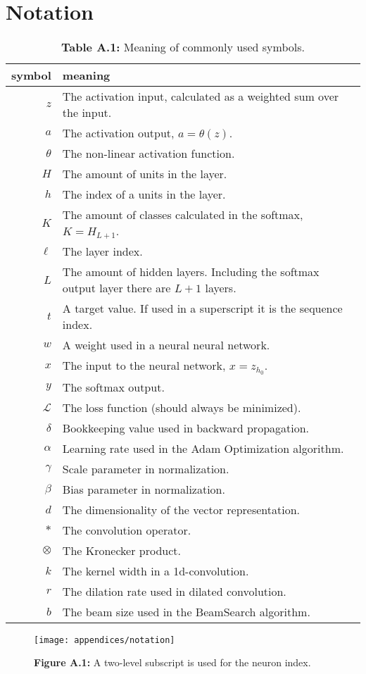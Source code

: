 \chapter{Notation}


\begin{table}[H]
\centering
\begin{tabular}{r p{10cm}}
	symbol & meaning \\ \hline
	$z$ & The activation input, calculated as a weighted sum over the input. \\
	$a$ & The activation output, $a = \theta(z)$. \\
	$\theta$ & The non-linear activation function. \\
	$H$ & The amount of units in the layer. \\
	$h$ & The index of a units in the layer. \\
	$K$ & The amount of classes calculated in the softmax, $K = H_{L+1}$. \\ 
	$\ell$ & The layer index. \\
	$L$ & The amount of hidden layers. Including the softmax output layer there are $L+1$ layers. \\
	$t$ & A target value. If used in a superscript it is the sequence index. \\
	$w$ & A weight used in a neural neural network. \\
	$x$ & The input to the neural network, $x = z_{h_0}$. \\
	$y$ & The softmax output. \\
	
	$\mathcal{L}$ & The loss function (should always be minimized). \\
	$\delta$ & Bookkeeping value used in backward propagation. \\
	$\alpha$ & Learning rate used in the Adam Optimization algorithm. \\
	
	$\gamma$ & Scale parameter in normalization. \\
	$\beta$ & Bias parameter in normalization. \\

	$d$ & The dimensionality of the vector representation. \\
    $*$ & The convolution operator. \\
    $\otimes$ & The Kronecker product. \\
	$k$ & The kernel width in a 1d-convolution. \\
	$r$ & The dilation rate used in dilated convolution. \\
    
	$b$ & The beam size used in the BeamSearch algorithm.
\end{tabular}
\caption*{\textbf{Table A.1: } Meaning of commonly used symbols.}
\end{table}

\begin{figure}[H]
	\vspace{-0.1cm}
	\centering
	\texttt{[image: appendices/notation]}
	\caption*{\textbf{Figure A.1: } A two-level subscript is used for the neuron index.}
\end{figure}
